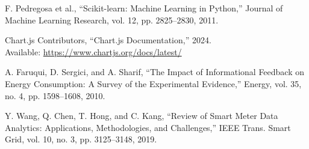 \documentclass[12pt, a4paper]{article}
\begin{document}
\begin{enumerate}[label={[\arabic*]}, leftmargin=*, topsep=6pt, itemsep=6pt]
		\item F. Pedregosa et al., ``Scikit-learn: Machine Learning in Python,'' Journal of Machine Learning Research, vol. 12, pp. 2825--2830, 2011.
		
		\item Chart.js Contributors, ``Chart.js Documentation,'' 2024. \\ Available: \url{https://www.chartjs.org/docs/latest/}
		
		\item A. Faruqui, D. Sergici, and A. Sharif, ``The Impact of Informational Feedback on Energy Consumption: A Survey of the Experimental Evidence,'' Energy, vol. 35, no. 4, pp. 1598--1608, 2010.
		
		\item Y. Wang, Q. Chen, T. Hong, and C. Kang, ``Review of Smart Meter Data Analytics: Applications, Methodologies, and Challenges,'' IEEE Trans. Smart Grid, vol. 10, no. 3, pp. 3125--3148, 2019.
	\end{enumerate}
	
\end{document}
